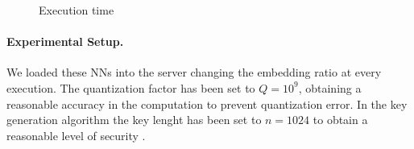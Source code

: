 \documentclass[11pt,oribibl,runningheads]{llncs}
\begin{document}
\begin{figure}
\centering {}
\qquad {}
\caption{Execution time}\label{results}
\end{figure}

\paragraph{Experimental Setup.}
We loaded these NNs into the server changing the embedding ratio at every execution. The quantization factor has been set to $Q=10^9$, obtaining a reasonable accuracy in the computation to prevent quantization error. In the key generation algorithm the key lenght has been set to $n=1024$ to obtain a reasonable level of security \cite{barker2005rkm}.
\end{document}
